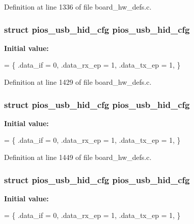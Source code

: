 Definition at line 1336 of file board\-\_\-hw\-\_\-defs.\-c.

\hypertarget{group___tau_labs_core_ga3665f6d3a2cccc431b55b9432291e94c}{
\subsubsection[{pios\-\_\-usb\-\_\-hid\-\_\-cfg}]{\setlength{\rightskip}{0pt plus 5cm}struct {\bf pios\-\_\-usb\-\_\-hid\-\_\-cfg} {\bf pios\-\_\-usb\-\_\-hid\-\_\-cfg}}}\label{group___tau_labs_core_ga3665f6d3a2cccc431b55b9432291e94c}
{\bfseries Initial value\-:}
\begin{DoxyCode}
= \{
        .data\_if = 0,
        .data\_rx\_ep = 1,
        .data\_tx\_ep = 1,
\}
\end{DoxyCode}


Definition at line 1429 of file board\-\_\-hw\-\_\-defs.\-c.

\hypertarget{group___tau_labs_core_ga3665f6d3a2cccc431b55b9432291e94c}{
\subsubsection[{pios\-\_\-usb\-\_\-hid\-\_\-cfg}]{\setlength{\rightskip}{0pt plus 5cm}struct {\bf pios\-\_\-usb\-\_\-hid\-\_\-cfg} {\bf pios\-\_\-usb\-\_\-hid\-\_\-cfg}}}\label{group___tau_labs_core_ga3665f6d3a2cccc431b55b9432291e94c}
{\bfseries Initial value\-:}
\begin{DoxyCode}
= \{
        .data\_if = 0,
        .data\_rx\_ep = 1,
        .data\_tx\_ep = 1,
\}
\end{DoxyCode}


Definition at line 1449 of file board\-\_\-hw\-\_\-defs.\-c.

\hypertarget{group___tau_labs_core_ga3665f6d3a2cccc431b55b9432291e94c}{
\subsubsection[{pios\-\_\-usb\-\_\-hid\-\_\-cfg}]{\setlength{\rightskip}{0pt plus 5cm}struct {\bf pios\-\_\-usb\-\_\-hid\-\_\-cfg} {\bf pios\-\_\-usb\-\_\-hid\-\_\-cfg}}}\label{group___tau_labs_core_ga3665f6d3a2cccc431b55b9432291e94c}
{\bfseries Initial value\-:}
\begin{DoxyCode}
= \{
        .data\_if = 0,
        .data\_rx\_ep = 1,
        .data\_tx\_ep = 1,
\}
\end{DoxyCode}


